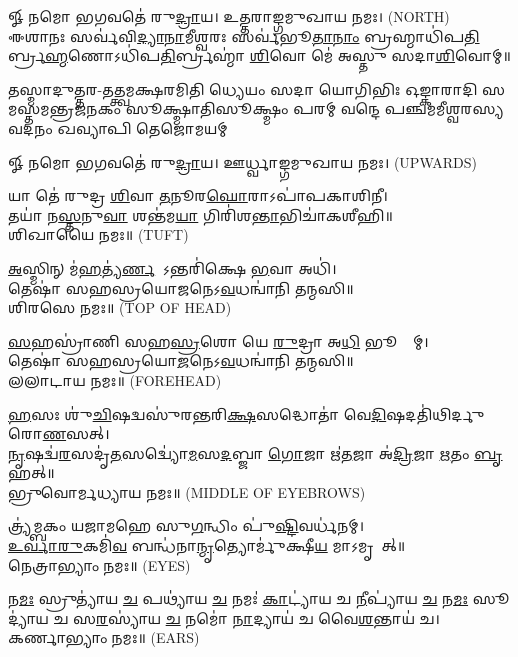 \begin{center}
𑍐 𑌨𑌮𑍋 𑌭𑌗𑌵𑌤𑍇॑ 𑌰𑍁\ul{𑌦𑍍𑌰𑌾}𑌯। 𑌉𑌤𑍍𑌤𑌰𑌾𑌙𑍍𑌗𑌮𑍁𑌖𑌾𑌯 𑌨𑌮𑌃। {\scriptsize (NORTH)}\\[1em]

𑌈𑌶𑌾𑌨𑌃 𑌸𑌰𑍍𑌵॑𑌵𑌿\ul{𑌦𑍍𑌯𑌾}\ul{𑌨𑌾}𑌮𑍀𑌶𑍍𑌵𑌰𑌃 𑌸𑌰𑍍𑌵॑𑌭𑍂\ul{𑌤𑌾}\ul{𑌨𑌾𑌂} 𑌬𑍍𑌰𑌹𑍍𑌮𑌾𑌧𑌿॑𑌪\ul{𑌤𑌿}𑌰𑍍𑌬𑍍𑌰\ul{𑌹𑍍𑌮}𑌣𑍋𑌽𑌧𑌿॑𑌪\ul{𑌤𑌿}𑌰𑍍𑌬𑍍𑌰𑌹𑍍𑌮𑌾॑ \ul{𑌶𑌿}𑌵𑍋 𑌮𑍇॑ 𑌅𑌸𑍍𑌤𑍁 𑌸𑌦𑌾\ul{𑌶𑌿}𑌵𑍋𑌮𑍍॥

{𑌤𑌸𑍍𑌮𑌾𑌦𑍁𑌤𑍍𑌤𑌰-𑌤𑌤𑍍𑌤𑍍𑌵𑌮𑌕𑍍𑌷𑌰𑌮𑌿𑌤𑌿 𑌧𑍍𑌯𑍇𑌯𑌂 𑌸𑌦𑌾 𑌯𑍋𑌗𑌿𑌭𑌿𑌃}
{𑌓𑌙𑍍𑌕𑌾𑌰𑌾𑌦𑌿 𑌸𑌮𑌸𑍍𑌤𑌮𑌨𑍍𑌤𑍍𑌰𑌜𑌨𑌕𑌂 𑌸𑍂𑌕𑍍𑌷𑍍𑌮𑌾𑌤𑌿𑌸𑍂𑌕𑍍𑌷𑍍𑌮𑌂 𑌪𑌰𑌮𑍍}
{𑌵𑌨𑍍𑌦𑍇 𑌪𑌞𑍍𑌚𑌮𑌮𑍀𑌶𑍍𑌵𑌰𑌸𑍍𑌯 𑌵𑌦𑌨𑌂 𑌖𑌵𑍍𑌯𑌾𑌪𑌿 𑌤𑍇𑌜𑍋𑌮𑌯𑌮𑍍}

𑍐 𑌨𑌮𑍋 𑌭𑌗𑌵𑌤𑍇॑ 𑌰𑍁\ul{𑌦𑍍𑌰𑌾}𑌯। 𑌊𑌰𑍍𑌧𑍍𑌵𑌾𑌙𑍍𑌗𑌮𑍁𑌖𑌾𑌯 𑌨𑌮𑌃। {\scriptsize (UPWARDS)}\\[1em]

\end{center}


 𑌯𑌾 𑌤𑍇॑ 𑌰𑍁𑌦𑍍𑌰 \ul{𑌶𑌿}𑌵𑌾 \ul{𑌤}𑌨𑍂𑌰\ul{𑌘𑍋}𑌰𑌾𑌽𑌪𑌾॑𑌪𑌕𑌾𑌶𑌿𑌨𑍀।\\
 𑌤𑌯𑌾॑ 𑌨\ul{𑌸𑍍𑌤}𑌨𑍁\ul{𑌵𑌾} 𑌶𑌨𑍍𑌤॑𑌮\ul{𑌯𑌾} 𑌗𑌿𑌰𑌿॑𑌶\ul{𑌨𑍍𑌤𑌾}𑌭𑌿𑌚𑌾॑𑌕𑌶𑍀𑌹𑌿॥\\ 𑌶𑌿𑌖𑌾𑌯𑍈 𑌨𑌮𑌃॥ {\scriptsize (TUFT)}

\ul{𑌅}𑌸𑍍𑌮𑌿𑌨𑍍 𑌮॑\ul{𑌹}𑌤𑍍𑌯॑\ul{𑌰𑍍𑌣}𑌵𑍇᳚𑌽𑌨𑍍𑌤𑌰𑌿॑𑌕𑍍𑌷𑍇 \ul{𑌭}𑌵𑌾 𑌅𑌧𑌿॑।\\
 𑌤𑍇𑌷𑌾॑ 𑌸𑌹𑌸𑍍𑌰𑌯𑍋\ul{𑌜}𑌨𑍇𑌽\ul{𑌵}𑌧𑌨𑍍𑌵𑌾॑𑌨𑌿 𑌤𑌨𑍍𑌮𑌸𑌿॥ \\
𑌶𑌿𑌰𑌸𑍇 𑌨𑌮𑌃॥ {\scriptsize (TOP OF HEAD)}

\ul{𑌸}𑌹𑌸𑍍𑌰𑌾॑𑌣𑌿 𑌸𑌹\ul{𑌸𑍍𑌰}𑌶𑍋 𑌯𑍇 \ul{𑌰𑍁}𑌦𑍍𑌰𑌾 𑌅\ul{𑌧𑌿} 𑌭𑍂𑌮𑍍𑌯𑌾᳚𑌮𑍍।\\
 𑌤𑍇𑌷𑌾॑ 𑌸𑌹𑌸𑍍𑌰𑌯𑍋\ul{𑌜}𑌨𑍇𑌽\ul{𑌵}𑌧𑌨𑍍𑌵𑌾॑𑌨𑌿 𑌤𑌨𑍍𑌮𑌸𑌿॥\\
𑌲𑌲𑌾𑌟𑌾𑌯 𑌨𑌮𑌃॥ {\scriptsize (FOREHEAD)}

\ul{𑌹}\ul{}𑌸𑌃 𑌶𑍁॑\ul{𑌚𑌿}𑌷𑌦𑍍𑌵𑌸𑍁॑𑌰𑌨𑍍𑌤𑌰𑌿\ul{𑌕𑍍𑌷}𑌸𑌦𑍍𑌧𑍋𑌤𑌾॑ 𑌵𑍇\ul{𑌦𑌿}𑌷𑌦𑌤𑌿॑𑌥𑌿𑌰𑍍𑌦𑍁𑌰𑍋\ul{𑌣}𑌸𑌤𑍍।\\
\ul{𑌨𑍃}𑌷𑌦𑍍𑌵॑\ul{𑌰}𑌸𑌦𑍃॑\ul{𑌤}𑌸𑌦𑍍𑌵𑍍𑌯𑍋॑\ul{𑌮}𑌸\ul{𑌦}𑌬𑍍𑌜𑌾 \ul{𑌗𑍋}𑌜𑌾 𑌋॑\ul{𑌤}𑌜𑌾 𑌅॑\ul{𑌦𑍍𑌰𑌿}𑌜𑌾 \ul{𑌋}𑌤𑌂 \ul{𑌬𑍃}𑌹𑌤𑍍॥\\
𑌭𑍍𑌰𑍁𑌵𑍋𑌰𑍍𑌮𑌧𑍍𑌯𑌾𑌯 𑌨𑌮𑌃॥ {\scriptsize (MIDDLE OF EYEBROWS)}


𑌤𑍍𑌰𑍍𑌯॑𑌮𑍍𑌬𑌕𑌂 𑌯𑌜𑌾𑌮𑌹𑍇 𑌸𑍁\ul{𑌗}𑌨𑍍𑌧𑌿𑌂 𑌪𑍁॑\ul{𑌷𑍍𑌟𑌿}𑌵𑌰𑍍𑌧॑𑌨𑌮𑍍।\\
 \ul{𑌉}\ul{𑌰𑍍𑌵𑌾}\ul{𑌰𑍁}𑌕𑌮𑌿॑\ul{𑌵} 𑌬𑌨𑍍𑌧॑𑌨𑌾\ul{𑌨𑍍𑌮𑍃}𑌤𑍍𑌯𑍋𑌰𑍍𑌮𑍁॑𑌕𑍍𑌷𑍀\ul{𑌯} 𑌮𑌾𑌽𑌮𑍃𑌤𑌾᳚𑌤𑍍॥\\
𑌨𑍇𑌤𑍍𑌰𑌾𑌭𑍍𑌯𑌾𑌂 𑌨𑌮𑌃॥ {\scriptsize (EYES)}

𑌨\ul{𑌮𑌃} 𑌸𑍍𑌰𑍁𑌤𑍍𑌯𑌾॑𑌯 \ul{𑌚} 𑌪𑌥𑍍𑌯𑌾॑𑌯 \ul{𑌚} 𑌨𑌮𑌃॑ \ul{𑌕𑌾}𑌟𑍍𑌯𑌾॑𑌯 𑌚 \ul{𑌨𑍀}𑌪𑍍𑌯𑌾॑𑌯 \ul{𑌚} %
 𑌨\ul{𑌮𑌃} 𑌸𑍂𑌦𑍍𑌯𑌾॑𑌯 𑌚 𑌸\ul{𑌰}𑌸𑍍𑌯𑌾॑𑌯 \ul{𑌚} 𑌨𑌮𑍋॑ \ul{𑌨𑌾}𑌦𑍍𑌯𑌾𑌯॑ 𑌚 𑌵𑍈\ul{𑌶}𑌨𑍍𑌤𑌾𑌯॑ 𑌚।\\
𑌕𑌰𑍍𑌣𑌾𑌭𑍍𑌯𑌾𑌂 𑌨𑌮𑌃॥ {\scriptsize (EARS)}

